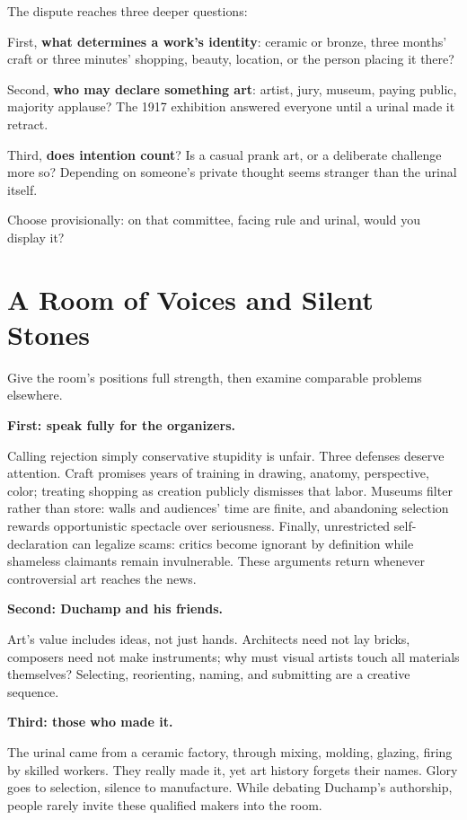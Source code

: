 The dispute reaches three deeper questions:

First, \textbf{what determines a work's identity}: ceramic or bronze, three months' craft or three minutes' shopping, beauty, location, or the person placing it there?

Second, \textbf{who may declare something art}: artist, jury, museum, paying public, majority applause? The 1917 exhibition answered everyone until a urinal made it retract.

Third, \textbf{does intention count}? Is a casual prank art, or a deliberate challenge more so? Depending on someone's private thought seems stranger than the urinal itself.

Choose provisionally: on that committee, facing rule and urinal, would you display it?

\section{A Room of Voices and Silent Stones}
Give the room's positions full strength, then examine comparable problems elsewhere.

\textbf{First: speak fully for the organizers.}

Calling rejection simply conservative stupidity is unfair. Three defenses deserve attention. Craft promises years of training in drawing, anatomy, perspective, color; treating shopping as creation publicly dismisses that labor. Museums filter rather than store: walls and audiences' time are finite, and abandoning selection rewards opportunistic spectacle over seriousness. Finally, unrestricted self-declaration can legalize scams: critics become ignorant by definition while shameless claimants remain invulnerable. These arguments return whenever controversial art reaches the news.

\textbf{Second: Duchamp and his friends.}

Art's value includes ideas, not just hands. Architects need not lay bricks, composers need not make instruments; why must visual artists touch all materials themselves? Selecting, reorienting, naming, and submitting are a creative sequence.

\textbf{Third: those who made it.}

The urinal came from a ceramic factory, through mixing, molding, glazing, firing by skilled workers. They really made it, yet art history forgets their names. Glory goes to selection, silence to manufacture. While debating Duchamp's authorship, people rarely invite these qualified makers into the room.

